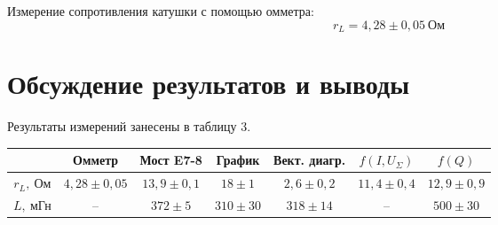 Измерение сопротивления катушки с
помощью омметра:
\[
    r_L = 4,28 \pm 0,05 \ \text{Ом}
\]


\section{Обсуждение результатов и выводы}
Результаты измерений занесены в таблицу
3.
\begin{table}[H]
    \begin{tabular}{|c|c|c|c|c|c|c|}
        \hline
        & Омметр & Мост E7-8 & График &
        Вект. диагр. & $f(I, U_\Sigma)$
                     & $f(Q)$ \\ \hline
        $r_L, \ \text{Ом}$ & $4,28\pm
        0,05$ & $13,9 \pm 0,1$ & $18
        \pm 1$ & $2,6 \pm 0,2$ & $11,4 \pm
        0,4$ & $12,9\pm 0,9$ \\ \hline
        $L, \ \text{мГн}$ & -- & $372 \pm 5$ & $310 \pm
        30$ & $318 \pm 14$ & -- & $500
        \pm 30$ \\ \hline
    \end{tabular}
\end{table}



